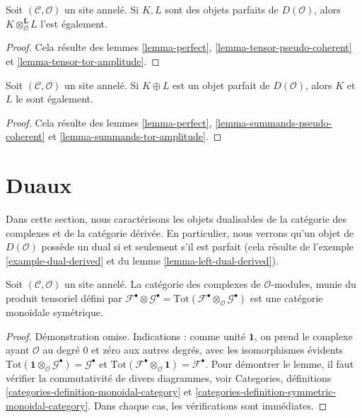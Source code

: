 \begin{lemma}
\label{lemma-tensor-perfect}
Soit $(\mathcal{C}, \mathcal{O})$ un site annelé. Si $K, L$ sont des objets
parfaits de $D(\mathcal{O})$, alors
$K \otimes_\mathcal{O}^\mathbf{L} L$ l'est également.
\end{lemma}

\begin{proof}
Cela résulte des lemmes \ref{lemma-perfect},
\ref{lemma-tensor-pseudo-coherent} et
\ref{lemma-tensor-tor-amplitude}.
\end{proof}

\begin{lemma}
\label{lemma-summands-perfect}
Soit $(\mathcal{C}, \mathcal{O})$ un site annelé. Si $K \oplus L$ est un
objet parfait de $D(\mathcal{O})$, alors $K$ et $L$ le sont également.
\end{lemma}

\begin{proof}
Cela résulte des lemmes \ref{lemma-perfect},
\ref{lemma-summands-pseudo-coherent} et
\ref{lemma-summands-tor-amplitude}.
\end{proof}














\section{Duaux}
\label{section-duals}

\noindent
Dans cette section, nous caractérisons les objets dualisables de la catégorie
des complexes et de la catégorie dérivée. En particulier, nous verrons qu'un
objet de $D(\mathcal{O})$ possède un dual si et seulement s'il est parfait
(cela résulte de l'exemple \ref{example-dual-derived} et du lemme
\ref{lemma-left-dual-derived}).

\begin{lemma}
\label{lemma-symmetric-monoidal-cat-complexes}
Soit $(\mathcal{C}, \mathcal{O})$ un site annelé. La catégorie des complexes
de $\mathcal{O}$-modules, munie du produit tensoriel défini par
$\mathcal{F}^\bullet \otimes \mathcal{G}^\bullet =
\text{Tot}(\mathcal{F}^\bullet \otimes_\mathcal{O} \mathcal{G}^\bullet)$
est une catégorie monoïdale symétrique.
\end{lemma}

\begin{proof}
Démonstration omise. Indications : comme unité $\mathbf{1}$, on prend le
complexe ayant $\mathcal{O}$ au degré $0$ et zéro aux autres degrés, avec les
isomorphismes évidents
$\text{Tot}(\mathbf{1} \otimes_\mathcal{O} \mathcal{G}^\bullet) =
\mathcal{G}^\bullet$ et
$\text{Tot}(\mathcal{F}^\bullet \otimes_\mathcal{O} \mathbf{1}) =
\mathcal{F}^\bullet$. Pour démontrer le lemme, il faut vérifier la
commutativité de divers diagrammes, voir Categories, définitions
\ref{categories-definition-monoidal-category} et
\ref{categories-definition-symmetric-monoidal-category}.
Dans chaque cas, les vérifications sont immédiates.
\end{proof}

